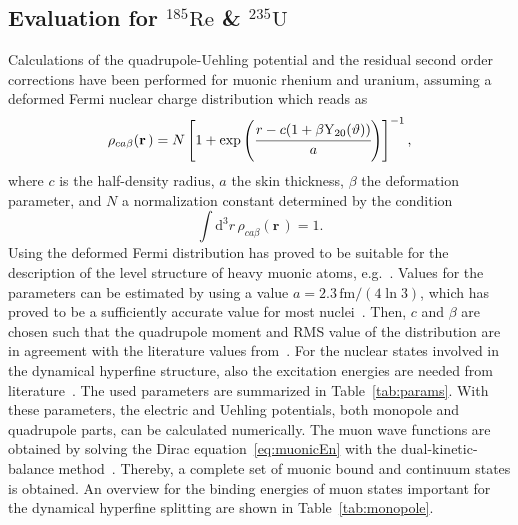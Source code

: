 \subsection{Evaluation for $^{185}\text{Re}$ \& $^{235}\text{U}$}
Calculations of the quadrupole-Uehling potential and the residual second order corrections have been performed for muonic rhenium and uranium, assuming a deformed Fermi nuclear charge distribution which reads as
\begin{equation}
\rho_{ca\beta}(\mathbf{r}\,)=N\left[1+\exp \left(\cfrac{r-c(1+\beta \text{Y}_{20}(\vartheta))}{a}\right)\right]^{-1},
\label{eq:deffermi_2}
\end{equation}
where $c$ is the half-density radius, $a$ the skin thickness, $\beta$ the deformation parameter, and $N$ a normalization constant determined by the condition
\begin{equation}
\int \text{d}^3r\, \rho_{ca\beta}(\mathbf{r}\,)=1.
\end{equation}
Using the deformed Fermi distribution has proved to be suitable for the description of the level structure of heavy muonic atoms, e.g.~\cite{hitlin1970,tanaka1984,tanaka1984_2}.
Values for the parameters can be estimated by using a value ${a}{=}{2.3\,\text{fm}/(4\ln 3)}$, which has proved to be a sufficiently accurate value for most nuclei~\cite{Beier2000}. Then, $c$ and $\beta$ are chosen such that the quadrupole moment and RMS value of the distribution are in agreement with the literature values from~\cite{Angeli2013,Stone2005}. For the nuclear states involved in the dynamical hyperfine structure, also the excitation energies are needed from literature~\cite{ENSDF}. The used parameters are summarized in Table~\ref{tab:params}.
With these parameters, the electric and Uehling potentials, both monopole and quadrupole parts, can be calculated numerically. The muon wave functions are obtained by solving the Dirac equation~\eqref{eq:muonicEn} with the dual-kinetic-balance method~\cite{Shabaev2004}. Thereby, a complete set of muonic bound and continuum states is obtained. An overview for the binding energies of muon states important for the dynamical hyperfine splitting are shown in Table~\ref{tab:monopole}.

